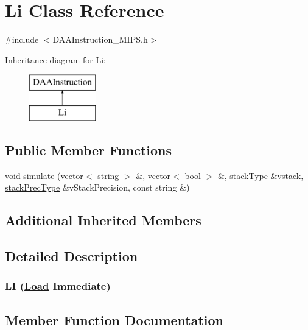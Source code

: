 \hypertarget{classLi}{}\section{Li Class Reference}
\label{classLi}


{\ttfamily \#include $<$D\+A\+A\+Instruction\+\_\+\+M\+I\+P\+S.\+h$>$}

Inheritance diagram for Li\+:\begin{figure}[H]
\begin{center}
\leavevmode
\includegraphics[height=2.000000cm]{classLi}
\end{center}
\end{figure}
\subsection*{Public Member Functions}
\begin{DoxyCompactItemize}
\item 
void \hyperlink{classLi_aa87ceab8573c0719a73c8b603b2ef52e}{simulate} (vector$<$ string $>$ \&, vector$<$ bool $>$ \&, \hyperlink{DAAInstruction_8h_a1b0e70ac1a04f06c8132055ed01f589f}{stack\+Type} \&vstack, \hyperlink{DAAInstruction_8h_ac5cb793e9dac3fa9693da78b7e29ab30}{stack\+Prec\+Type} \&v\+Stack\+Precision, const string \&)
\end{DoxyCompactItemize}
\subsection*{Additional Inherited Members}


\subsection{Detailed Description}


 \subsubsection*{LI (\hyperlink{classLoad}{Load} Immediate) }

\subsection{Member Function Documentation}
\mbox{\label{classLi_aa87ceab8573c0719a73c8b603b2ef52e}} 
